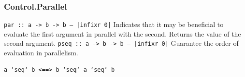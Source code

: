 \documentclass{beamer}
\newcommand{\inlinehaskell}[1]{\texttt{#1}}
\begin{document}

\begin{frame}
\frametitle{Control.Parallel}
\inlinehaskell{par :: a -> b -> b  -- |infixr 0|}\newline
Indicates that it may be beneficial to evaluate the first argument in parallel with the second. Returns the value of the second argument.\newline\newline
\inlinehaskell{pseq :: a -> b -> b   -- |infixr 0|}\newline
Guarantee the order of evaluation in parallelism.\newline
\newline\pause

\inlinehaskell{a `seq` b <==> b `seq` a `seq` b}

\end{frame}
\end{document}

